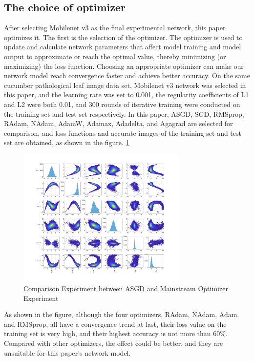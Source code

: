 \documentclass[a4paper,fleqn]{cas-sc}
\begin{document}
\subsection{The choice of optimizer}
After selecting Mobilenet v3 as the final experimental network, this paper optimizes it. The first is the selection of the optimizer. The optimizer is used to update and calculate network parameters that affect model training and model output to approximate or reach the optimal value, thereby minimizing (or maximizing) the loss function. Choosing an appropriate optimizer can make our network model reach convergence faster and achieve better accuracy. On the same cucumber pathological leaf image data set, Mobilenet v3 network was selected in this paper, and the learning rate was set to 0.001, the regularity coefficients of L1 and L2 were both 0.01, and 300 rounds of iterative training were conducted on the training set and test set respectively. In this paper, ASGD, SGD, RMSprop, RAdam, NAdam, AdamW, Adamax, Adadelta, and Agagrad are selected for comparison, and loss functions and accurate images of the training set and test set are obtained, as shown in the figure. \ref{fig:f5}
\begin{figure}
\centering
\includegraphics[width=0.75\textwidth]{figs/f5.png}
\caption{Comparison Experiment between ASGD and Mainstream Optimizer Experiment}
\label{fig:f5}
\end{figure}

As shown in the figure, although the four optimizers, RAdam, NAdam, Adam, and RMSprop, all have a convergence trend at last, their loss value on the training set is very high, and their highest accuracy is not more than 60\%. Compared with other optimizers, the effect could be better, and they are unsuitable for this paper's network model. 
\end{document}
